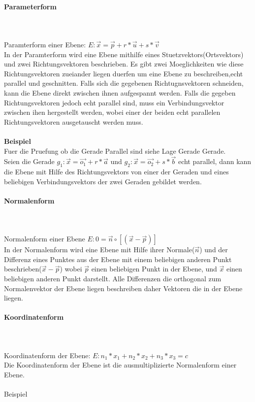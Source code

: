 \documentclass[a4paper]{article} %
\begin{document}
	\paragraph{Parameterform}
		\hspace{0 cm} \\ \noindent \\
	Paramterform einer Ebene: $E : \vec{x} = \vec{p}+ r*\vec{u}+s*\vec{v}$\\
	In der Paramterform wird eine Ebene mithilfe eines Stuetzvektors(Ortsvektors) und zwei Richtungsvektoren beschrieben.
	Es gibt zwei Moeglichkeiten wie diese Richtungsvektoren zueiander liegen duerfen um eine Ebene zu beschreiben,echt parallel und geschnitten. Falls sich die gegebenen Richtugnsvektoren schneiden, kann die Ebene direkt zwischen ihnen aufgespannt werden.
	Falls die gegeben Richtungsvektoren jedoch echt parallel sind, muss ein Verbindungsvektor zwischen ihen hergestellt werden, wobei einer der beiden echt parallelen Richtungsvektoren ausgetauscht werden muss.
	\\\\\textbf{Beispiel}\\
	Fuer die Pruefung ob die Gerade Parallel sind siehe Lage Gerade Gerade.\\
	Seien die Gerade $g_1: \vec{x}= \vec{o_1}+r*\vec{a}$ und $ g_2: \vec{x}=\vec{o_2}+s*\vec{b} $ echt parallel,
	dann kann die Ebene mit Hilfe des Richtungsvektors von einer der Geraden und eines beliebigen Verbindungsvektors der zwei Geraden gebildet werden.
	\paragraph{Normalenform}
		\hspace{0 cm} \\ \noindent \\
		Normalenform einer Ebene $E : 0 = \vec{n}\circ\left[\left(\vec{x}-\vec{p}\right)   \right]$\\
		In der Normalenform wird eine Ebene mit Hilfe ihrer Normale($\vec{n}$) und der Differenz eines Punktes aus der Ebene mit einem beliebigen anderen Punkt beschrieben($\vec{x}-\vec{p}$) wobei $\vec{p}$ einen beliebigen Punkt in der Ebene, und $\vec{x}$ einen beliebigen anderen Punkt darstellt. Alle Differenzen die orthogonal zum Normalenvektor der Ebene liegen beschreiben daher Vektoren die in der Ebene liegen.

	\paragraph{Koordinatenform}
		\hspace{0 cm} \\ \noindent \\
		Koordinatenform der Ebene: $E: n_1*x_1+n_2*x_2+n_3*x_3=c$\\
		Die Koordinatenform der Ebene ist die ausmultiplizierte Normalenform einer Ebene.
		\\\\Beispiel
\end{document}
